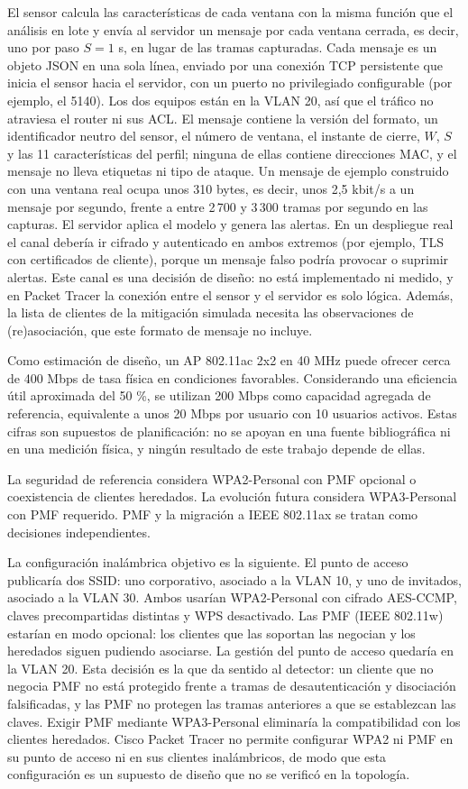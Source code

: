 \documentclass[journal]{IEEEtran}
\begin{document}
El sensor calcula las características de cada ventana con la misma función que el análisis en lote y envía al servidor un mensaje por cada ventana cerrada, es decir, uno por paso $S = 1$ s, en lugar de las tramas capturadas. Cada mensaje es un objeto JSON en una sola línea, enviado por una conexión TCP persistente que inicia el sensor hacia el servidor, con un puerto no privilegiado configurable (por ejemplo, el 5140). Los dos equipos están en la VLAN 20, así que el tráfico no atraviesa el router ni sus ACL. El mensaje contiene la versión del formato, un identificador neutro del sensor, el número de ventana, el instante de cierre, $W$, $S$ y las 11 características del perfil; ninguna de ellas contiene direcciones MAC, y el mensaje no lleva etiquetas ni tipo de ataque. Un mensaje de ejemplo construido con una ventana real ocupa unos 310 bytes, es decir, unos 2,5 kbit/s a un mensaje por segundo, frente a entre 2\,700 y 3\,300 tramas por segundo en las capturas. El servidor aplica el modelo y genera las alertas. En un despliegue real el canal debería ir cifrado y autenticado en ambos extremos (por ejemplo, TLS con certificados de cliente), porque un mensaje falso podría provocar o suprimir alertas. Este canal es una decisión de diseño: no está implementado ni medido, y en Packet Tracer la conexión entre el sensor y el servidor es solo lógica. Además, la lista de clientes de la mitigación simulada necesita las observaciones de (re)asociación, que este formato de mensaje no incluye.

Como estimación de diseño, un AP 802.11ac 2x2 en 40 MHz puede ofrecer cerca de 400 Mbps de tasa física en condiciones favorables. Considerando una eficiencia útil aproximada del 50 \%, se utilizan 200 Mbps como capacidad agregada de referencia, equivalente a unos 20 Mbps por usuario con 10 usuarios activos. Estas cifras son supuestos de planificación: no se apoyan en una fuente bibliográfica ni en una medición física, y ningún resultado de este trabajo depende de ellas.

La seguridad de referencia considera WPA2-Personal con PMF opcional o coexistencia de clientes heredados. La evolución futura considera WPA3-Personal con PMF requerido. PMF y la migración a IEEE 802.11ax se tratan como decisiones independientes.

La configuración inalámbrica objetivo es la siguiente. El punto de acceso publicaría dos SSID: uno corporativo, asociado a la VLAN 10, y uno de invitados, asociado a la VLAN 30. Ambos usarían WPA2-Personal con cifrado AES-CCMP, claves precompartidas distintas y WPS desactivado. Las PMF (IEEE 802.11w) estarían en modo opcional: los clientes que las soportan las negocian y los heredados siguen pudiendo asociarse. La gestión del punto de acceso quedaría en la VLAN 20. Esta decisión es la que da sentido al detector: un cliente que no negocia PMF no está protegido frente a tramas de desautenticación y disociación falsificadas, y las PMF no protegen las tramas anteriores a que se establezcan las claves. Exigir PMF mediante WPA3-Personal eliminaría la compatibilidad con los clientes heredados. Cisco Packet Tracer no permite configurar WPA2 ni PMF en su punto de acceso ni en sus clientes inalámbricos, de modo que esta configuración es un supuesto de diseño que no se verificó en la topología.
\end{document}
